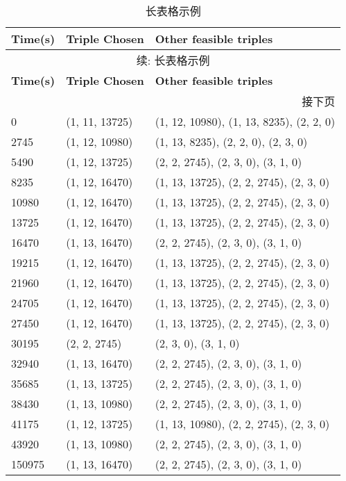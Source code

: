 {
\footnotesize
\begin{longtable}{lll}
	\caption{长表格示例}
	\label{table:topoTestCase} \\
	\hline
	\textbf{Time(s)} & \textbf{Triple Chosen} & \textbf{Other feasible triples} \\
	\hline
	\endfirsthead
	\multicolumn{3}{c}{\small{续\tablename \thetable: 长表格示例}\vspace{0.8em}} \\
	\hline
	\textbf{Time(s)} & \textbf{Triple Chosen} & \textbf{Other feasible triples} \\
	\hline
	\endhead
	\hline
	\multicolumn{3}{r}{接下页} \\
	\endfoot
	\hline
	\endlastfoot
	0 & (1, 11, 13725) & (1, 12, 10980), (1, 13, 8235), (2, 2, 0) \\
	2745 & (1, 12, 10980) & (1, 13, 8235), (2, 2, 0), (2, 3, 0) \\
	5490 & (1, 12, 13725) & (2, 2, 2745), (2, 3, 0), (3, 1, 0) \\
	8235 & (1, 12, 16470) & (1, 13, 13725), (2, 2, 2745), (2, 3, 0) \\
	10980 & (1, 12, 16470) & (1, 13, 13725), (2, 2, 2745), (2, 3, 0) \\
	13725 & (1, 12, 16470) & (1, 13, 13725), (2, 2, 2745), (2, 3, 0) \\
	16470 & (1, 13, 16470) & (2, 2, 2745), (2, 3, 0), (3, 1, 0) \\
	19215 & (1, 12, 16470) & (1, 13, 13725), (2, 2, 2745), (2, 3, 0) \\
	21960 & (1, 12, 16470) & (1, 13, 13725), (2, 2, 2745), (2, 3, 0) \\
	24705 & (1, 12, 16470) & (1, 13, 13725), (2, 2, 2745), (2, 3, 0) \\
	27450 & (1, 12, 16470) & (1, 13, 13725), (2, 2, 2745), (2, 3, 0) \\
	30195 & (2, 2, 2745) & (2, 3, 0), (3, 1, 0) \\
	32940 & (1, 13, 16470) & (2, 2, 2745), (2, 3, 0), (3, 1, 0) \\
	35685 & (1, 13, 13725) & (2, 2, 2745), (2, 3, 0), (3, 1, 0) \\
	38430 & (1, 13, 10980) & (2, 2, 2745), (2, 3, 0), (3, 1, 0) \\
	41175 & (1, 12, 13725) & (1, 13, 10980), (2, 2, 2745), (2, 3, 0) \\
	43920 & (1, 13, 10980) & (2, 2, 2745), (2, 3, 0), (3, 1, 0) \\
	150975 & (1, 13, 16470) & (2, 2, 2745), (2, 3, 0), (3, 1, 0) \\
	\hline
\end{longtable}
}
